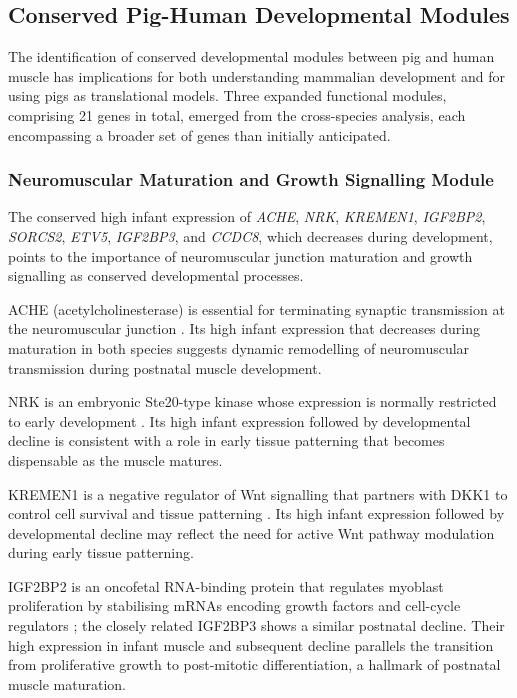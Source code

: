 \subsection{Conserved Pig-Human Developmental Modules}

The identification of conserved developmental modules between pig and human muscle has implications for both understanding mammalian development and for using pigs as translational models. Three expanded functional modules, comprising 21 genes in total, emerged from the cross-species analysis, each encompassing a broader set of genes than initially anticipated.

\subsubsection{Neuromuscular Maturation and Growth Signalling Module}

The conserved high infant expression of \textit{ACHE}, \textit{NRK}, \textit{KREMEN1}, \textit{IGF2BP2}, \textit{SORCS2}, \textit{ETV5}, \textit{IGF2BP3}, and \textit{CCDC8}, which decreases during development, points to the importance of neuromuscular junction maturation and growth signalling as conserved developmental processes.

ACHE (acetylcholinesterase) is essential for terminating synaptic transmission at the neuromuscular junction \parencite{rotundo_expression_2003}. Its high infant expression that decreases during maturation in both species suggests dynamic remodelling of neuromuscular transmission during postnatal muscle development.

NRK is an embryonic Ste20-type kinase whose expression is normally restricted to early development \parencite{kanai-azuma_nrk_1999}. Its high infant expression followed by developmental decline is consistent with a role in early tissue patterning that becomes dispensable as the muscle matures.

KREMEN1 is a negative regulator of Wnt signalling that partners with DKK1 to control cell survival and tissue patterning \parencite{osada_wnt_2006, qin_canonical_2024}. Its high infant expression followed by developmental decline may reflect the need for active Wnt pathway modulation during early tissue patterning.

IGF2BP2 is an oncofetal RNA-binding protein that regulates myoblast proliferation by stabilising mRNAs encoding growth factors and cell-cycle regulators \parencite{li_hmga2-igf2bp2_2012}; the closely related IGF2BP3 shows a similar postnatal decline. Their high expression in infant muscle and subsequent decline parallels the transition from proliferative growth to post-mitotic differentiation, a hallmark of postnatal muscle maturation.

